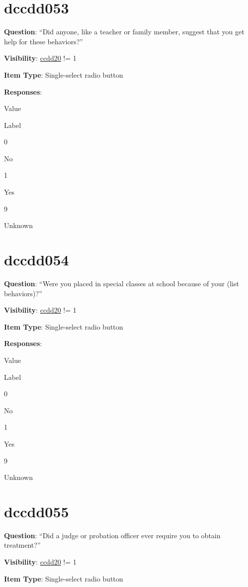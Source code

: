\documentclass[]{book}
\begin{document}
\hypertarget{dccdd053}{%
\section{dccdd053}\label{dccdd053}}

\textbf{Question}: ``Did anyone, like a teacher or family member, suggest that you get help for these behaviors?''

\textbf{Visibility}: \protect\hyperlink{ccdd20}{ccdd20} != 1

\textbf{Item Type}: Single-select radio button

\textbf{Responses}:

Value

Label

0

No

1

Yes

9

Unknown

\hypertarget{dccdd054}{%
\section{dccdd054}\label{dccdd054}}

\textbf{Question}: ``Were you placed in special classes at school because of your (list behaviors)?''

\textbf{Visibility}: \protect\hyperlink{ccdd20}{ccdd20} != 1

\textbf{Item Type}: Single-select radio button

\textbf{Responses}:

Value

Label

0

No

1

Yes

9

Unknown

\hypertarget{dccdd055}{%
\section{dccdd055}\label{dccdd055}}

\textbf{Question}: ``Did a judge or probation officer ever require you to obtain treatment?''

\textbf{Visibility}: \protect\hyperlink{ccdd20}{ccdd20} != 1

\textbf{Item Type}: Single-select radio button
\end{document}

